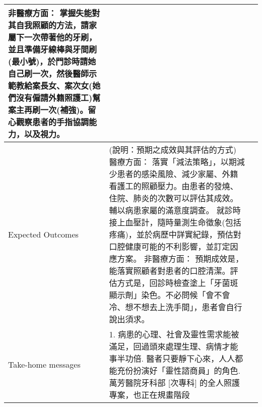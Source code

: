 \documentclass[12pt, a4paper]{article}
\begin{document}
\begin{xltabular}{1.0\linewidth}[c]{|p{2.3cm}|p{12.4cm}|l|}
   非醫療方面： 掌握失能對其自我照顧的方法，請家屬下一次帶著他的牙刷，並且準備牙線棒與牙間刷(最小號)，於門診時請她自己刷一次，然後醫師示範教給案長女、案次女(她們沒有僱請外籍照護工)幫案主再刷一次(補強)。留心觀察患者的手指協調能力，以及視力。 &
   \\ \hline
Expected Outcomes &
  {\color[HTML]{C0C0C0}(說明：預期之成效與其評估的方式)}\newline 
   醫療方面： 落實「減法策略」，以期減少患者的感染風險、減少家屬、外籍看護工的照顧壓力。由患者的發燒、住院、肺炎的次數可以評估其成效。輔以病患家屬的滿意度調查。 就診時接上血壓計，隨時量測生命徵象(包括疼痛)，並於病歷中詳實紀錄，預估對口腔健康可能的不利影響，並訂定因應方案。\newline 
   非醫療方面： 預期成效是，能落實照顧者對患者的口腔清潔。評估方式是，回診時檢查塗上「牙菌斑顯示劑」染色。不必問候「會不會冷、想不想去上洗手間」，患者會自行說出須求。 &
   \\ \hline
Take-home messages &
    1. 病患的心理、社會及靈性需求能被滿足，回過頭來處理生理、病情才能事半功倍. 醫者只要靜下心來，人人都能充份扮演好「靈性諮商員」的角色. 萬芳醫院牙科部 [次專科]  的全人照護專案，也正在規畫階段 \newline
    &
   \\ \hline
\end{xltabular}

\end{document}
